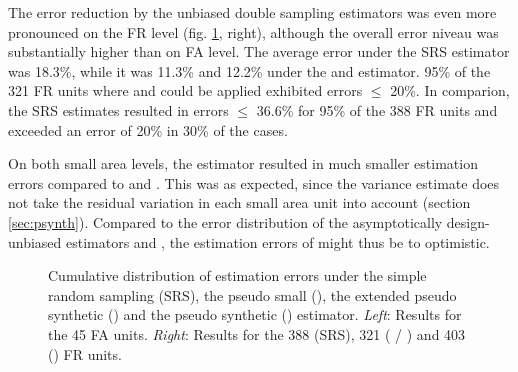 The error reduction by the unbiased double sampling estimators was even more pronounced on the FR level (fig. \ref{fig:disterrors}, right), although the overall error niveau was substantially higher than on FA level. The average error under the SRS estimator was 18.3\%, while it was 11.3\% and 12.2\% under the \psmall{} and \extpsynth{} estimator. 95\% of the 321 FR units where \psmall{} and \extpsynth{} could be applied exhibited errors $\leq$ 20\%. In comparion, the SRS estimates resulted in errors $\leq$ 36.6\% for 95\% of the 388 FR units and exceeded an error of 20\% in 30\% of the cases.\par

On both small area levels, the \psynth{} estimator resulted in much smaller estimation errors compared to \psmall{} and \extpsynth{}. This was as expected, since the \psynth{} variance estimate does not take the residual variation in each small area unit into account (section \ref{sec:psynth}). Compared to the error distribution of the asymptotically design-unbiased estimators \psmall{} and \extpsynth{}, the estimation errors of \psynth{} might thus be to optimistic.

\begin{figure}[H]
	\centering
	\caption{Cumulative distribution of estimation errors under the simple random sampling (SRS), the pseudo small (\psmall{}), the extended pseudo synthetic (\extpsynth{}) and the pseudo synthetic (\psynth{}) estimator. \textit{Left}: Results for the 45 FA units. \textit{Right}: Results for the 388 (SRS), 321 (\psmall{} / \extpsynth{}) and 403 (\psynth{}) FR units.}
	\label{fig:disterrors}
\end{figure}


